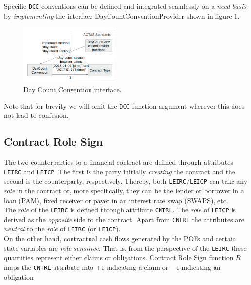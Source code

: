 \documentclass[9pt,oneside]{amsart}
\newcommand{\attr}[1]{\texttt{#1}}
\begin{document}
\begin{multicols}{2}
Specific \attr{DCC} conventions can be defined and integrated seamlessly on a \textit{need-basis} by \textit{implementing} the interface DayCountConventionProvider shown in figure \ref{fig:dcc-interface}.

\begin{figure}[H]
	\centering
	\includegraphics[width=0.45\textwidth]{./media/dcc-interface.png}
	\caption{Day Count Convention interface.}
	\label{fig:dcc-interface}
\end{figure}

Note that for brevity we will omit the \attr{DCC} function argument wherever this does not lead to confusion.


\subsection{Contract Role Sign}

The two counterparties to a financial contract are defined through attributes \attr{LEIRC} and \attr{LEICP}. The first is the party initially \textit{creating} the contract and the second is the counterparty, respectively. Thereby, both \attr{LEIRC}/\attr{LEICP} can take any \textit{role} in the contract or, more specifically, they can be the lender or borrower in a loan (PAM), fixed receiver or payer in an interest rate swap (SWAPS), etc.\\

The \textit{role} of the \attr{LEIRC} is defined through attribute \attr{CNTRL}. The \textit{role} of \attr{LEICP} is derived as the \textit{opposite} side to the contract. Apart from \attr{CNTRL} the attributes are \textit{neutral} to the \textit{role} of \attr{LEIRC} (or \attr{LEICP}).\\

On the other hand, contractual cash flows generated by the POFs and certain state variables are \textit{role-sensitive}. That is, from the perspective of the \attr{LEIRC} these quantities represent either claims or obligations. Contract Role Sign function $R$ maps the \attr{CNTRL} attribute into $+1$ indicating a claim or $-1$ indicating an obligation


\end{multicols}
\end{document}

